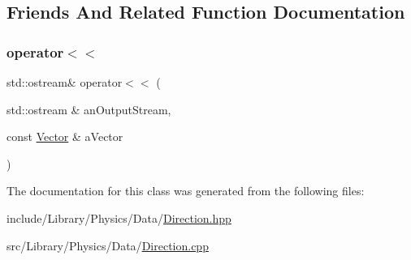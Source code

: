 \subsection{Friends And Related Function Documentation}
\mbox{\label{classlibrary_1_1physics_1_1data_1_1_direction_a2f1253dbad20965d2209456421eabf71}} 
\subsubsection{\texorpdfstring{operator$<$$<$}{operator<<}}
{\footnotesize\ttfamily std\+::ostream\& operator$<$$<$ (\begin{DoxyParamCaption}\item[{std\+::ostream \&}]{an\+Output\+Stream,  }\item[{const \hyperlink{classlibrary_1_1physics_1_1data_1_1_vector}{Vector} \&}]{a\+Vector }\end{DoxyParamCaption})\hspace{0.3cm}{\ttfamily [friend]}}



The documentation for this class was generated from the following files\+:\begin{DoxyCompactItemize}
\item 
include/\+Library/\+Physics/\+Data/\hyperlink{_direction_8hpp}{Direction.\+hpp}\item 
src/\+Library/\+Physics/\+Data/\hyperlink{_direction_8cpp}{Direction.\+cpp}\end{DoxyCompactItemize}
